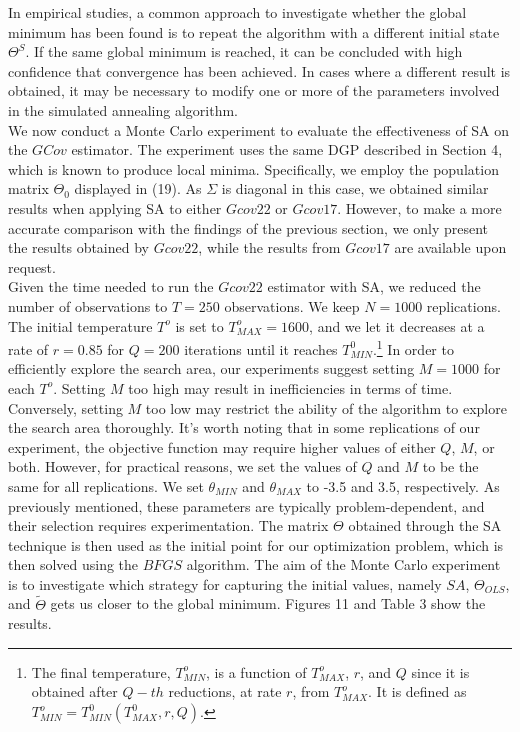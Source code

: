 \documentclass[<1p>]{elsarticle} %
\begin{document}
\indent In empirical studies, a common approach to investigate whether the global minimum has been found is to repeat the algorithm with a different initial state $\Theta^{S}$. If the same global minimum is reached, it can be concluded with high confidence that convergence has been achieved. In cases where a different result is obtained, it may be necessary to modify one or more of the parameters involved in the simulated annealing algorithm.\\
\indent We now conduct a Monte Carlo experiment to evaluate the effectiveness of SA on the $GCov$ estimator. The experiment uses the same DGP described in Section 4, which is known to produce local minima. Specifically, we employ the population matrix $\Theta_{0}$ displayed in (19). As $\Sigma$ is diagonal in this case, we obtained similar results when applying SA to either $Gcov22$ or $Gcov17$. However, to make a more accurate comparison with the findings of the previous section, we only present the results obtained by $Gcov22$, while the results from $Gcov17$ are available upon request.\\
\indent Given the time needed to run the $Gcov22$ estimator with SA, we reduced the number of observations to $T=250$ observations. We keep $N=1000$ replications. The initial temperature $T^{o}$ is set to $T^{o}_{MAX}=1600$, and we let it decreases at a rate of $r=0.85$ for $Q=200$ iterations until it reaches $T_{MIN}^0$.\footnote{The final temperature, $T^{o}_{MIN}$, is a function of $T^{o}_{MAX}$, $r$, and $Q$ since it is obtained after $Q-th$ reductions, at rate $r$, from $T^{o}_{MAX}$. It is defined as $T^{o}_{MIN} = T^{0}_{MIN}(T^{0}_{MAX}, r, Q)$.} In order to efficiently explore the search area, our experiments suggest setting $M=1000$ for each $T^o$. Setting $M$ too high may result in inefficiencies in terms of time. Conversely, setting $M$ too low may restrict the ability of the algorithm to explore the search area thoroughly.  It's worth noting that in some replications of our experiment, the objective function may require higher values of either $Q$, $M$, or both. However, for practical reasons, we set the values of $Q$ and $M$ to be the same for all replications. We set $\theta_{MIN}$ and $\theta_{MAX}$ to -3.5 and 3.5, respectively. As previously mentioned, these parameters are typically problem-dependent, and their selection requires experimentation. The matrix $\Theta$ obtained through the SA technique is then used as the initial point for our optimization problem, which is then solved using the $BFGS$ algorithm. The aim of the Monte Carlo experiment is to investigate which strategy for capturing the initial values, namely $SA$,  $\Theta_{OLS}$, and $\widetilde{\Theta}$ gets us closer to the global minimum. Figures 11 and Table 3 show the results.\\
\end{document}
